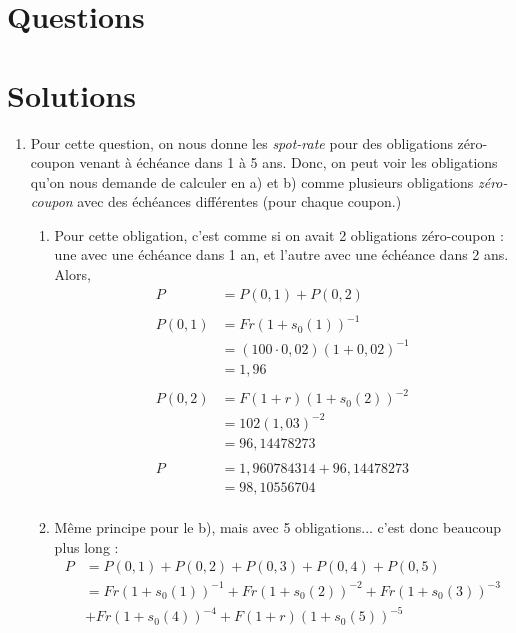 \section{Questions}


\section{Solutions}
\begin{enumerate}
  \item %
  Pour cette question, on nous donne les \emph{spot-rate} pour des obligations
  zéro-coupon venant à échéance dans 1 à 5 ans. Donc, on peut voir les obligations
  qu'on nous demande de calculer en a) et b) comme plusieurs obligations \emph{zéro-coupon}
  avec des échéances différentes (pour chaque coupon.)
  \begin{enumerate}[label=\alph*)]
    \item Pour cette obligation, c'est comme si on avait 2 obligations zéro-coupon :
    une avec une échéance dans 1 an, et l'autre avec une échéance dans 2 ans. Alors,
    \begin{align*}
      P     & = P(0,1) + P(0,2) \\
      \\
      P(0,1)& = Fr(1+s_0(1))^{-1} \\
            & = (100 \cdot 0,02)(1+0,02)^{-1} \\
            & = 1,96 \\
      \\
      P(0,2)& = F(1+r)(1+s_0(2))^{-2} \\
            & = 102(1,03)^{-2} \\
            & = 96,14478273 \\
      \\
      P     & = 1,960784314 + 96,14478273 \\
            & = 98,10556704 \\
    \end{align*}
    \item Même principe pour le b), mais avec 5 obligations... c'est donc beaucoup
    plus long :
    \begin{align*}
      P   & = P(0,1) + P(0,2) + P(0,3) + P(0,4) + P(0,5) \\
          & = Fr(1+s_0(1))^{-1} + Fr(1+s_0(2))^{-2} + Fr(1+s_0(3))^{-3} \\
          & + Fr(1+s_0(4))^{-4} + F(1+r)(1+s_0(5))^{-5} \\

\end{align*}
\end{enumerate}
\end{enumerate}
